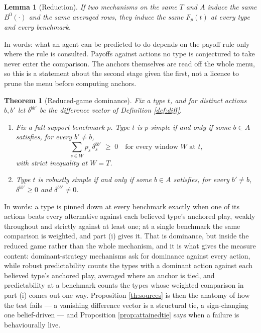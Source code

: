 \documentclass[12pt]{article}
\newtheorem{theorem}{Theorem}
\newtheorem{lemma}{Lemma}
\theoremstyle{definition}
\begin{document}
\begin{lemma}[Reduction]\label{lem:reduction}
If two mechanisms on the same $T$ and $A$ induce the same $B^0(\cdot)$ and the same averaged rows, they induce the same $F_p(t)$ at every type and every benchmark.
\end{lemma}

In words: what an agent can be predicted to do depends on the payoff rule only where the rule is consulted. Payoffs against actions no type is conjectured to take never enter the comparison. The anchors themselves are read off the whole menu, so this is a statement about the second stage given the first, not a licence to prune the menu before computing anchors.

\begin{theorem}[Reduced-game dominance]\label{th:dominance}
Fix a type $t$, and for distinct actions $b, b'$ let $\delta^{bb'}$ be the difference vector of Definition \ref{def:diff}.
\begin{enumerate}
\item[i.] Fix a full-support benchmark $p$. Type $t$ is $p$-simple if and only if some $b \in A$ satisfies, for every $b' \neq b$,
\[
\sum_{s \in W} p_s\, \delta^{bb'}_s \;\ge\; 0 \quad \text{for every window } W \text{ at } t,
\]
with strict inequality at $W = T$.
\item[ii.] Type $t$ is robustly simple if and only if some $b \in A$ satisfies, for every $b' \neq b$, $\delta^{bb'} \ge 0$ and $\delta^{bb'} \neq 0$.
\end{enumerate}
\end{theorem}

In words: a type is pinned down at every benchmark exactly when one of its actions beats every alternative against each believed type's anchored play, weakly throughout and strictly against at least one; at a single benchmark the same comparison is weighted, and part (i) gives it. That is dominance, but inside the reduced game rather than the whole mechanism, and it is what gives the measure content: dominant-strategy mechanisms ask for dominance against every action, while robust predictability counts the types with a dominant action against each believed type's anchored play, averaged where an anchor is tied, and predictability at a benchmark counts the types whose weighted comparison in part (i) comes out one way. Proposition \ref{th:sources} is then the anatomy of how the test fails --- a vanishing difference vector is a structural tie, a sign-changing one belief-driven --- and Proposition \ref{prop:attainedtie} says when a failure is behaviourally live.
\end{document}
